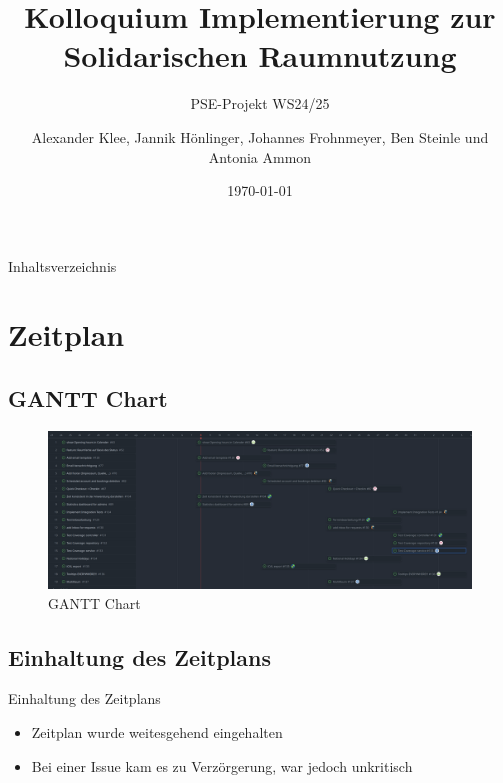 \documentclass{sdqbeamer}
\title[Solidarische Raumnutzung Pflichtenheft]{Kolloquium Implementierung zur Solidarischen Raumnutzung}
\subtitle{PSE-Projekt WS24/25}
\author[Soli-Gruppe]{Alexander Klee, Jannik Hönlinger, Johannes Frohnmeyer, Ben Steinle und Antonia Ammon}
\date{\today}
\begin{document}
 
\KITtitleframe

\begin{frame}{Inhaltsverzeichnis}
\tableofcontents
\end{frame}

\section{Zeitplan}

\subsection{GANTT Chart}
\begin{frame}{\insertsubsectionhead}
    \begin{figure}
        \centering
        \includegraphics[width=1\linewidth]{tasks.png}
        \caption{GANTT Chart}
        \label{fig:enter-label}
    \end{figure}
\end{frame}
\subsection{Einhaltung des Zeitplans}
\begin{frame}{Einhaltung des Zeitplans}
    \begin{itemize}
        \item Zeitplan wurde weitesgehend eingehalten
        \item Bei einer Issue kam es zu Verzörgerung, war jedoch unkritisch
    \end{itemize}
\end{frame}
\end{document}
